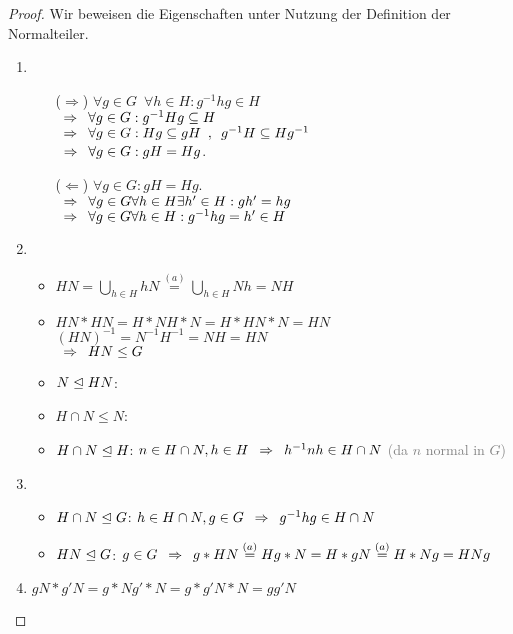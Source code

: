 \begin{proof}
	Wir beweisen die Eigenschaften unter Nutzung der Definition der Normalteiler.
	\begin{enumerate}
		\item \begin{itemize}
			\itemsep1pt
			\item [($\Rightarrow$)] $\forall g \in G \enspace \forall h \in H : g^{-1} h g \in H$ \\
			$\enspace \Rightarrow \enspace \forall g \in G : g^{-1}Hg \subseteq H$ \\
			$\enspace \Rightarrow \enspace \forall g \in G : Hg \subseteq gH \enspace , \enspace g^{-1}H \subseteq Hg^{-1}$ \\
			$\enspace \Rightarrow \enspace \forall g \in G : gH = Hg$.
			\item [($\Leftarrow$)] $\forall g \in G : gH = Hg$.\\
			$\enspace \Rightarrow \enspace \forall g \in G \forall h \in H \exists h' \in H : gh' = hg$ \\
			$\enspace \Rightarrow \enspace \forall g \in G \forall h \in H : g^{-1}hg = h' \in H$
			\end{itemize}
		\item \begin{itemize}
			\item $HN = \bigcup_{h \in H}{hN} \overset{(a)}{=} \bigcup_{h \in H}{Nh} = NH$
			\item $HN * HN = H* NH * N = H * HN * N = HN$ \\
			      $(HN)^{-1} = N^{-1} H^{-1} = NH = HN$ \\
			      $\enspace \Rightarrow \enspace HN \leq G$
			\item $N \trianglelefteq HN$: \checkmark
			\item $H \cap N \leq N$: \checkmark
			\item $H \cap N \trianglelefteq H$: $n \in H \cap N, h \in H \enspace \Rightarrow \enspace h^{-1}nh \in H \cap N$ \textcolor{gray}{(da $n$ normal in $G$)}
		\end{itemize}
		\item \begin{itemize}
			\item $H \cap N \trianglelefteq G$: $h \in H \cap N, g \in G \enspace \Rightarrow \enspace g^{-1}hg \in H \cap N$
			\item $HN \trianglelefteq G$: $g \in G \enspace \Rightarrow \enspace g *HN \overset{(a)}{=} Hg * N = H * gN \overset{(a)}{=} H * Ng = HNg$
		\end{itemize}
		\item $gN * g'N = g * Ng' * N = g * g'N * N = gg'N$
	\end{enumerate}
\end{proof}
